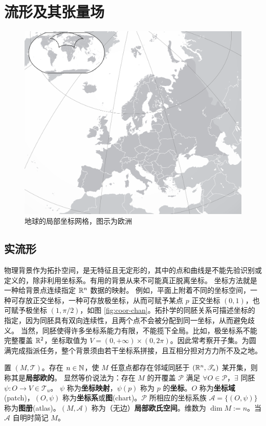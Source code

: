 \chapter{流形及其张量场}\label{appx:manifold}
    \begin{figure}[h!]\centering
    \includegraphics[width=.8\textwidth]{fig/appx/Europe-Blank.png}
    \caption{地球的局部坐标网格，图示为欧洲}
\end{figure}

\section{实流形}
物理背景作为拓扑空间，是无特征且无定形的，其中的点和曲线是不能先验识别或定义的，除非利用坐标系。有用的背景从来不可能真正脱离坐标。
坐标方法就是一种给背景点连续指定 $\mathbb{R}^n$ 数据的映射。
例如，平面上附着不同的坐标空间，一种可存放正交坐标，一种可存放极坐标，从而可赋予某点 $p$ 正交坐标 $(0,1)$，也可赋予极坐标 $(1,\pi/2)$，如图 \ref{fig:coor-chan}。拓扑学的同胚关系可描述坐标的指定，因为同胚具有双向连续性，且两个点不会被分配到同一坐标，从而避免歧义。
当然，同胚使得许多坐标系能力有限，不能揽下全局。比如，极坐标系不能完整覆盖 $\mathbb{R}^2$，坐标取值为 $V=(0,+\infty)\times(0,2\pi)$。因此常考察开子集。为圆满完成指派任务，整个背景须由若干坐标系拼接，且互相分担对方力所不及之地。

\begin{definition}
    置 $(M,\mathscr T)$。存在 $n\in\mathbb{N}$，使 $M$ 任意点都存在邻域同胚于 $(\mathbb{R}^n,\mathscr T_u)$ 某开集，则称其是\textbf{局部欧的}。
    显然等价说法为：存在 $M$ 的开覆盖 $\mathscr P$ 满足 $\forall O\in\mathscr P$，$\exists$ 同胚 $\psi:O\to V\in\mathscr T_u$。
    $\psi$ 称为\textbf{坐标映射}，$\psi(p)$ 称为 $p$ 的\textbf{坐标}。$O$ 称为\textbf{坐标域}(patch)，$(O,\psi)$ 称为\textbf{坐标系}或\textbf{图}(chart)。$\mathscr P$ 所相应的坐标系族 $\mathcal A=\{(O,\psi)\}$ 称为\textbf{图册}(atlas)。$(M,\mathcal A)$ 称为（无边）\textbf{局部欧氏空间}。维数为 $\dim M:=n$。当 $\mathcal A$ 自明时简记 $M$。
\end{definition}

